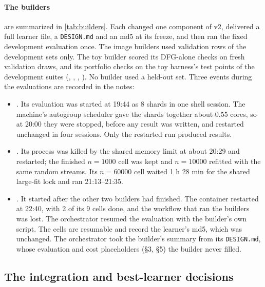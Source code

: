 \paragraph{The builders} are summarized in \cref{tab:builders}. Each changed one component of v2, delivered a full learner file, a \texttt{DESIGN.md} and an md5 at its freeze, and then ran the fixed development evaluation once. The image builders used validation rows of the development sets only. The toy builder scored its DFG-alone checks on fresh validation draws, and its portfolio checks on the toy harness's test points of the development suites (, , , ). No builder used a held-out set. Three events during the evaluations are recorded in the notes:
\begin{itemize}
\item \emph{.} Its evaluation was started at 19:44 as 8 shards in one shell session. The machine's autogroup scheduler gave the shards together about 0.55 cores, so at 20:00 they were stopped, before any result was written, and restarted unchanged in four sessions. Only the restarted run produced results.
\item \emph{.} Its  process was killed by the shared memory limit at about 20:29 and restarted; the finished $n=1000$ cell was kept and $n=10000$ refitted with the same random streams. Its $n=60000$ cell waited 1 h 28 min for the shared large-fit lock and ran 21:13--21:35.
\item \emph{.} It started after the other two builders had finished. The container restarted at 22:40, with 2 of its 9 cells done, and the workflow that ran the builders was lost. The orchestrator resumed the evaluation with the builder's own script. The cells are resumable and record the learner's md5, which was unchanged. The orchestrator took the builder's summary from its \texttt{DESIGN.md}, whose evaluation and cost placeholders (\S3, \S5) the builder never filled.
\end{itemize}

\subsection{The integration and best-learner decisions}\label{sec:decisions}

